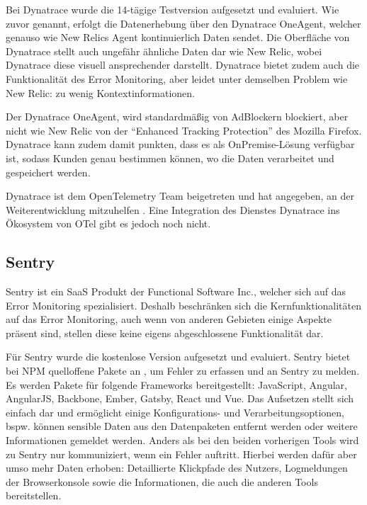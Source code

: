 Bei Dynatrace wurde die 14-tägige Testversion aufgesetzt und evaluiert. Wie zuvor genannt, erfolgt die Datenerhebung über den Dynatrace OneAgent, welcher genauso wie New Relics Agent kontinuierlich Daten sendet. Die Oberfläche von Dynatrace stellt auch ungefähr ähnliche Daten dar wie New Relic, wobei Dynatrace diese visuell ansprechender darstellt. Dynatrace bietet zudem auch die Funktionalität des Error Monitoring, aber leidet unter demselben Problem wie New Relic: zu wenig Kontextinformationen.

Der Dynatrace OneAgent, wird standardmäßig von AdBlockern blockiert, aber nicht wie New Relic von der \enquote{Enhanced Tracking Protection} des Mozilla Firefox. Dynatrace kann zudem damit punkten, dass es als OnPremise-Lösung verfügbar ist, sodass Kunden genau bestimmen können, wo die Daten verarbeitet und gespeichert werden.

Dynatrace ist dem OpenTelemetry Team beigetreten und hat angegeben, an der Weiterentwicklung mitzuhelfen \cite{DynatraceJoinOTelProject}. Eine Integration des Dienstes Dynatrace ins Ökosystem von OTel gibt es jedoch noch nicht.

\vspace{-0.5\baselineskip}
\subsection{Sentry}

Sentry \cite{Sentry} ist ein SaaS Produkt der Functional Software Inc., welcher sich auf das Error Monitoring spezialisiert. Deshalb beschränken sich die Kernfunktionalitäten auf das Error Monitoring, auch wenn von anderen Gebieten einige Aspekte präsent sind, stellen diese keine eigens abgeschlossene Funktionalität dar.

Für Sentry wurde die kostenlose Version aufgesetzt und evaluiert. Sentry bietet bei NPM quelloffene Pakete an \cite{SentryJSGithub}, um Fehler zu erfassen und an Sentry zu melden. Es werden Pakete für folgende Frameworks bereitgestellt: JavaScript, Angular, AngularJS, Backbone, Ember, Gatsby, React und Vue. Das Aufsetzen stellt sich einfach dar und ermöglicht einige Konfigurations- und Verarbeitungsoptionen, bspw. können sensible Daten aus den Datenpaketen entfernt werden oder weitere Informationen gemeldet werden. Anders als bei den beiden vorherigen Tools wird zu Sentry nur kommuniziert, wenn ein Fehler auftritt. Hierbei werden dafür aber umso mehr Daten erhoben: Detaillierte Klickpfade des Nutzers, Logmeldungen der Browserkonsole sowie die Informationen, die auch die anderen Tools bereitstellen.

